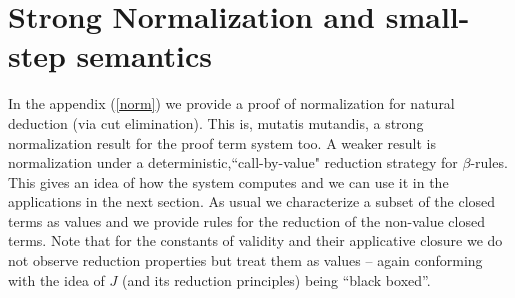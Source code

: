         \section{Strong Normalization and small-step semantics}
        In the appendix (\ref{norm}) we provide a proof of normalization for  
        natural deduction (via cut elimination). 
        This is, mutatis mutandis, a strong normalization result for the proof term system too. A  weaker result is 
        normalization under a  deterministic,``call-by-value" reduction strategy for $\beta$-rules.
        This   gives
        an idea of how the system computes  and we can use it in the applications in the next section. 
        As usual we characterize a subset of the closed terms as values and we provide rules for the reduction of the non-value closed terms.
        Note that for the constants of validity and their applicative closure we do not observe reduction properties but treat them as values -- again conforming with the idea of $J$ (and its reduction principles) being ``black boxed''.

